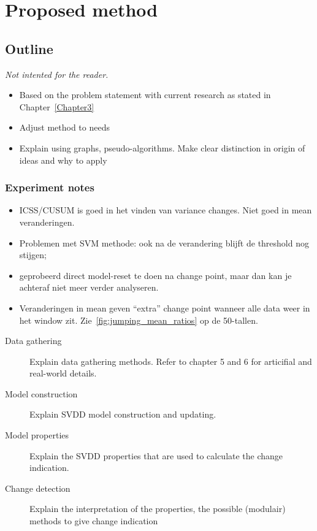 
\chapter{Proposed method}

\label{Chapter4} %


\section{Outline}
\emph{Not intented for the reader.}
\begin{itemize}
  \item Based on the problem statement with current research as stated in Chapter~\ref{Chapter3}
  \item Adjust method to needs
  \item Explain using graphs, pseudo-algorithms. Make clear distinction in origin of ideas and why to apply
\end{itemize}


\subsection{Experiment notes}
\begin{itemize}
  \item ICSS/CUSUM is goed in het vinden van variance changes. Niet goed in mean veranderingen.
  \item Problemen met SVM methode: ook na de verandering blijft de threshold nog stijgen;
  \item geprobeerd direct model-reset te doen na change point, maar dan kan je achteraf niet meer verder analyseren.
  \item Veranderingen in mean geven ``extra'' change point wanneer alle data weer in het window zit. Zie~\ref{fig:jumping_mean_ratios} op de 50-tallen.
\end{itemize}


\begin{description}
  \item[Data gathering] Explain data gathering methods. Refer to chapter 5 and 6 for articifial and real-world details.
  \item[Model construction] Explain SVDD model construction and updating.
  \item[Model properties] Explain the SVDD properties that are used to calculate the change indication.
  \item[Change detection] Explain the interpretation of the properties, the possible (modulair) methods to give change indication
\end{description}



